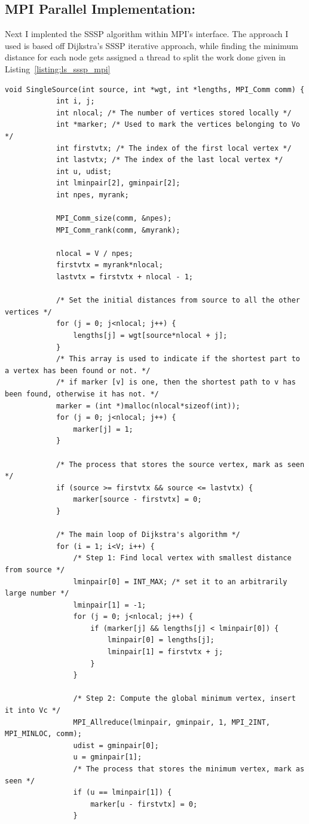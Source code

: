 	\subsection{MPI Parallel Implementation:}
	Next I implented the SSSP algorithm within MPI's interface. The approach I used is based off Dijkstra's SSSP iterative approach, while finding the minimum distance for each node gets assigned a thread to split the work done\cite{he2021parallelizing} given in Listing~\ref{listing:ls_sssp_mpi}
	\begin{lstlisting}[caption={MPI Parallel algorithm for computing SSSP\cite{he2021parallelizing}}, label={listing:ls_sssp_mpi}]
		void SingleSource(int source, int *wgt, int *lengths, MPI_Comm comm) {
			int i, j;
			int nlocal; /* The number of vertices stored locally */
			int *marker; /* Used to mark the vertices belonging to Vo */
			int firstvtx; /* The index of the first local vertex */
			int lastvtx; /* The index of the last local vertex */
			int u, udist;
			int lminpair[2], gminpair[2];
			int npes, myrank;
			
			MPI_Comm_size(comm, &npes);
			MPI_Comm_rank(comm, &myrank);
			
			nlocal = V / npes;
			firstvtx = myrank*nlocal;
			lastvtx = firstvtx + nlocal - 1;
			
			/* Set the initial distances from source to all the other vertices */
			for (j = 0; j<nlocal; j++) {
				lengths[j] = wgt[source*nlocal + j];
			}
			/* This array is used to indicate if the shortest part to a vertex has been found or not. */
			/* if marker [v] is one, then the shortest path to v has been found, otherwise it has not. */
			marker = (int *)malloc(nlocal*sizeof(int));
			for (j = 0; j<nlocal; j++) {
				marker[j] = 1;
			}
			
			/* The process that stores the source vertex, mark as seen */
			if (source >= firstvtx && source <= lastvtx) {
				marker[source - firstvtx] = 0;
			}
			
			/* The main loop of Dijkstra's algorithm */
			for (i = 1; i<V; i++) {
				/* Step 1: Find local vertex with smallest distance from source */
				lminpair[0] = INT_MAX; /* set it to an arbitrarily large number */
				lminpair[1] = -1;
				for (j = 0; j<nlocal; j++) {
					if (marker[j] && lengths[j] < lminpair[0]) {
						lminpair[0] = lengths[j];
						lminpair[1] = firstvtx + j;
					}
				}
				
				/* Step 2: Compute the global minimum vertex, insert it into Vc */
				MPI_Allreduce(lminpair, gminpair, 1, MPI_2INT, MPI_MINLOC, comm);
				udist = gminpair[0];
				u = gminpair[1];
				/* The process that stores the minimum vertex, mark as seen */
				if (u == lminpair[1]) {
					marker[u - firstvtx] = 0;
				}
				

\end{lstlisting}
